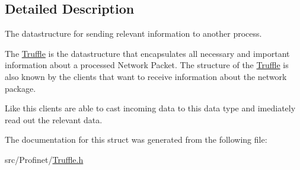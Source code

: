 \subsection{Detailed Description}
The datastructure for sending relevant information to another process. 

The \hyperlink{struct_truffle}{Truffle} is the datastructure that encapsulates all necessary and important information about a processed Network Packet. The structure of the \hyperlink{struct_truffle}{Truffle} is also known by the clients that want to receive information about the network package.

Like this clients are able to cast incoming data to this data type and imediately read out the relevant data. 

The documentation for this struct was generated from the following file\+:\begin{DoxyCompactItemize}
\item 
src/\+Profinet/\hyperlink{_truffle_8h}{Truffle.\+h}\end{DoxyCompactItemize}
